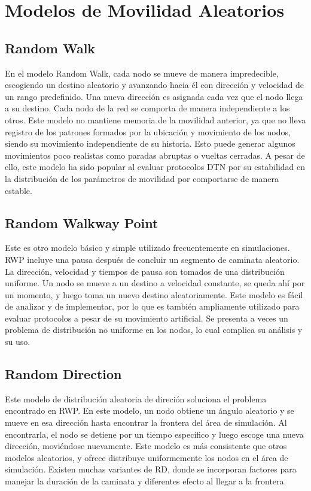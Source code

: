 \section{Modelos de Movilidad Aleatorios}

\subsection{Random Walk}
En el modelo Random Walk, cada nodo se mueve de manera impredecible, escogiendo un destino aleatorio y avanzando hacia él con dirección y velocidad de un rango predefinido. Una nueva dirección es asignada cada vez que el nodo llega a su destino. Cada nodo de la red se comporta de manera independiente a los otros. Este modelo no mantiene memoria de la movilidad anterior, ya que no lleva registro de los patrones formados por la ubicación y movimiento de los nodos, siendo su movimiento independiente de su historia. Esto puede generar algunos movimientos poco realistas como paradas abruptas o vueltas cerradas. A pesar de ello, este modelo ha sido popular al evaluar protocolos DTN por su estabilidad en la distribución de los parámetros de movilidad por comportarse de manera estable.

\subsection{Random Walkway Point}
Este es otro modelo básico y simple utilizado frecuentemente en simulaciones. RWP incluye una pausa después de concluir un segmento de caminata aleatorio. La dirección, velocidad y tiempos de pausa son tomados de una distribución uniforme. Un nodo se mueve a un destino a velocidad constante, se queda ahí por un momento, y luego toma un nuevo destino aleatoriamente. Este modelo es fácil de analizar y de implementar, por lo que es también ampliamente utilizado para evaluar protocolos a pesar de su movimiento artificial. Se presenta a veces un problema de distribución no uniforme en los nodos, lo cual complica su análisis y su uso.

\subsection{Random Direction}
Este modelo de distribución aleatoria de direción soluciona el problema encontrado en RWP. En este modelo, un nodo obtiene un ángulo aleatorio y se mueve en esa dirección hasta encontrar la frontera del área de simulación. Al encontrarla, el nodo se detiene por un tiempo específico y luego escoge una nueva dirección, moviéndose nuevamente. Este modelo es más consistente que otros modelos aleatorios, y ofrece distribuye uniformemente los nodos en el área de simulación. Existen muchas variantes de RD, donde se incorporan factores para manejar la duración de la caminata y diferentes efecto al llegar a la frontera.

